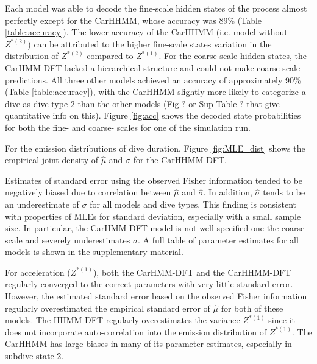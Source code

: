 

\iffalse
Each model was able to decode the fine-scale hidden states of the process almost perfectly except for the CarHHMM, whose accuracy was 89\% (Table \ref{table:accuracy}). The lower accuracy of the CarHHMM (i.e. model without $Z^{*(2)}$)  can be attributed to the higher fine-scale states variation in the distribution of $Z^{*(2)}$ compared to $Z^{*(1)}$. For the coarse-scale hidden states, the CarHMM-DFT lacked a hierarchical structure and could not make coarse-scale predictions. All three other models achieved an accuracy of approximately 90\% (Table \ref{table:accuracy}), with the CarHHMM slightly more likely to categorize a dive as dive type 2 than the other models (Fig ? or Sup Table ? that give quantitative info on this). Figure \ref{fig:acc} shows the decoded state probabilities for both the fine- and coarse- scales for one of the simulation run.

For the emission distributions of dive duration, Figure \ref{fig:MLE_dist} shows the empirical joint density of $\hat \mu$ and $\hat \sigma$ for the CarHHMM-DFT.

Estimates of standard error using the observed Fisher information tended to be negatively biased due to correlation between $\hat \mu$ and $\hat \sigma$. In addition, $\hat \sigma$ tends to be an underestimate of $\sigma$ for all models and dive types. This finding is consistent with properties of MLEs for standard deviation, especially with a small sample size. In particular, the CarHMM-DFT model is not well specified one the coarse-scale and severely underestimates $\sigma$. %
A full table of parameter estimates for all models is shown in the supplementary material.


For acceleration ($Z^{*(1)}$), both the CarHMM-DFT and the CarHHMM-DFT regularly converged to the correct parameters with very little standard error. However, the estimated standard error based on the observed Fisher information regularly overestimated the empirical standard error of $\hat \mu$ for both of these models. 
The HHMM-DFT regularly overestimates the variance $Z^{*(1)}$ since it does not incorporate auto-correlation into the emission distribution of $Z^{*(1)}$. The CarHHMM has large biases in many of its parameter estimates, especially in subdive state 2. 


